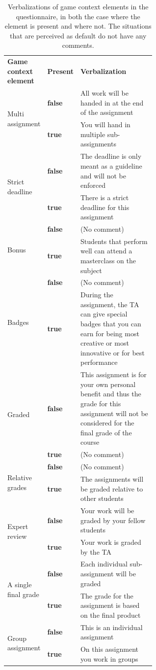 \documentclass[11pt]{article}
\newcommand{\ra}[1]{\renewcommand{\arraystretch}{#1}}
\begin{document}
\begin{table}[h!t]
  \centering
\ra{1.3}
  \begin{tabular}{ll p{0.6\linewidth}}
\toprule
    \textbf{Game context element} & \textbf{Present} & \textbf{Verbalization} \\ 
\cmidrule{1-2}
\cmidrule{3-3}
    \multirow{2}{*}{Multi assignment} & \textbf{false} & All work will be handed in at the end of the assignment \\
    & \textbf{true} & You will hand in multiple sub-assignments \\ \hline
    \multirow{2}{*}{Strict deadline} & \textbf{false} & The deadline is only meant as a guideline and will not be enforced \\
    & \textbf{true} & There is a strict deadline for this assignment \\ \hline
    \multirow{2}{*}{Bonus} & \textbf{false} & (No comment) \\
    & \textbf{true} & Students that perform well can attend a masterclass on the subject \\ \hline
    \multirow{2}{*}{Badges} & \textbf{false} & (No comment) \\
    & \textbf{true} & During the assignment, the TA can give special badges that you can earn for being most creative or most innovative or for best performance \\ \hline
    \multirow{2}{*}{Graded} & \textbf{false} & This assignment is for your own personal benefit and thus the grade for this assignment will not be considered for the final grade of the course \\
    & \textbf{true} & (No comment) \\ \hline
    \multirow{2}{*}{Relative grades} &  \textbf{false} & (No comment) \\
    & \textbf{true} & The assignments will be graded relative to other students \\ \hline
    \multirow{2}{*}{Expert review} & \textbf{false} & Your work will be graded by your fellow students \\
   & \textbf{true} & Your work is graded by the TA \\ \hline
    \multirow{2}{*}{A single final grade} & \textbf{false} & Each individual sub-assignment will be graded \\
    & \textbf{true} & The grade for the assignment is based on the final product \\ \hline
    \multirow{2}{*}{Group assignment} & \textbf{false} & This is an individual assignment \\
    & \textbf{true} & On this assignment you work in groups \\
\bottomrule
  \end{tabular}
  \caption{Verbalizations of game context elements in the questionnaire, in both the case where the element is present and where not. The situations that are perceived as default do not have any comments.}
  \label{tab:questionnaire_verbalizations}
\end{table}
\end{document}
